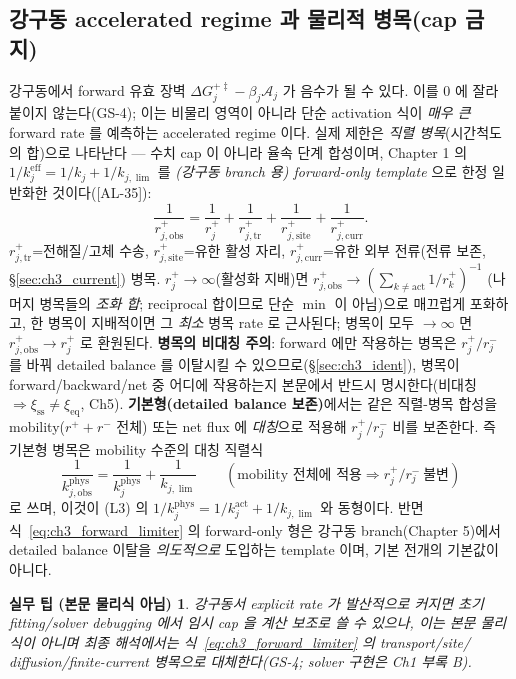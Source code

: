 \documentclass[11pt,a4paper]{article}
\newtheorem*{practicebox}{실무 팁 (본문 물리식 아님)}
\newcommand{\eff}{\mathrm{eff}}
\newcommand{\eq}{\mathrm{eq}}
\newcommand{\sstat}{\mathrm{ss}}
\newcommand{\obs}{\mathrm{obs}}
\newcommand{\trans}{\mathrm{tr}}
\newcommand{\site}{\mathrm{site}}
\newcommand{\curr}{\mathrm{curr}}
\newcommand{\AL}[1]{\textsf{[AL-#1]}}
\begin{document}
\subsection{강구동 accelerated regime 과 물리적 병목(cap 금지)}\label{sec:ch3_limiter}
강구동에서 forward 유효 장벽 $\Delta G_j^{+\ddagger}-\beta_j\mathcal A_j$ 가 음수가 될 수 있다. 이를 $0$ 에 잘라
붙이지 않는다(GS-4); 이는 비물리 영역이 아니라 단순 activation 식이 \emph{매우 큰} forward rate 를 예측하는
accelerated regime 이다. 실제 제한은 \emph{직렬 병목}(시간척도의 합)으로 나타난다 — 수치 cap 이 아니라 율속
단계 합성이며, Chapter 1 의 $1/k_j^{\eff}=1/k_j+1/k_{j,\lim}$ 를 \emph{(강구동 branch 용) forward-only
template} 으로 한정 일반화한 것이다(\AL{35}):
\begin{equation}
\frac{1}{r_{j,\obs}^+}=\frac{1}{r_j^+}+\frac{1}{r_{j,\trans}^+}+\frac{1}{r_{j,\site}^+}+\frac{1}{r_{j,\curr}^+}.
\label{eq:ch3_forward_limiter}
\end{equation}
$r_{j,\trans}^+$=전해질/고체 수송, $r_{j,\site}^+$=유한 활성 자리, $r_{j,\curr}^+$=유한 외부 전류(전류 보존,
\S\ref{sec:ch3_current}) 병목. $r_j^+\to\infty$(활성화 지배)면 $r_{j,\obs}^+\to(\sum_{k\ne\mathrm{act}}1/r_k^+)^{-1}$
(나머지 병목들의 \emph{조화 합}; reciprocal 합이므로 단순 $\min$ 이 아님)으로 매끄럽게 포화하고, 한 병목이
지배적이면 그 \emph{최소} 병목 rate 로 근사된다; 병목이 모두 $\to\infty$ 면 $r_{j,\obs}^+\to r_j^+$ 로 환원된다. \textbf{병목의 비대칭 주의}: forward
에만 작용하는 병목은 $r_j^+/r_j^-$ 를 바꿔 detailed balance 를 이탈시킬 수 있으므로(\S\ref{sec:ch3_ident}),
병목이 forward/backward/net 중 어디에 작용하는지 본문에서 반드시 명시한다(비대칭 $\Rightarrow\xi_{\sstat}\ne\xi_{\eq}$, Ch5).
\textbf{기본형(detailed balance 보존)}에서는 같은 직렬-병목 합성을 mobility($r^++r^-$ 전체) 또는 net flux 에
\emph{대칭}으로 적용해 $r_j^+/r_j^-$ 비를 보존한다. 즉 기본형 병목은 mobility 수준의 대칭 직렬식
\begin{equation}
\frac{1}{k_{j,\obs}^{\mathrm{phys}}}=\frac{1}{k_j^{\mathrm{phys}}}+\frac{1}{k_{j,\lim}}
\qquad(\text{mobility 전체에 적용}\Rightarrow r_j^+/r_j^-\ \text{불변})
\label{eq:ch3_mobility_limiter}
\end{equation}
로 쓰며, 이것이 (L3) 의 $1/k_j^{\mathrm{phys}}=1/k_j^{\mathrm{act}}+1/k_{j,\lim}$ 와 동형이다. 반면
식~\eqref{eq:ch3_forward_limiter} 의 forward-only 형은 강구동 branch(Chapter 5)에서 detailed balance 이탈을
\emph{의도적으로} 도입하는 template 이며, 기본 전개의 기본값이 아니다.
\begin{practicebox}
강구동서 explicit rate 가 발산적으로 커지면 초기 fitting/solver debugging 에서 임시 cap 을 \emph{계산 보조}로
쓸 수 있으나, 이는 \emph{본문 물리식이 아니며} 최종 해석에서는 식~\eqref{eq:ch3_forward_limiter} 의 transport/site/
diffusion/finite-current 병목으로 대체한다(GS-4; solver 구현은 Ch1 부록 B).
\end{practicebox}
\end{document}
